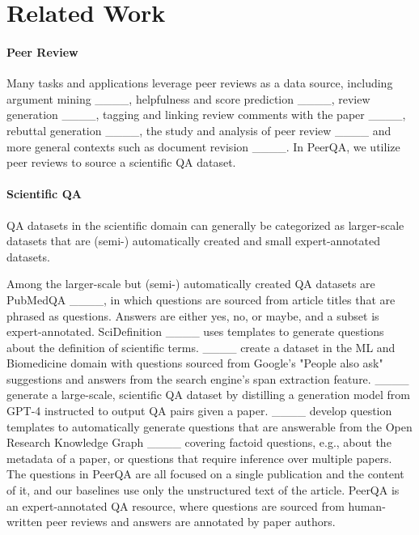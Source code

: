 \section{Related Work}
\paragraph{Peer Review} Many tasks and applications leverage peer reviews as a data source, including argument mining ____, helpfulness and score prediction ____, review generation ____, tagging and linking review comments with the paper ____, rebuttal generation ____, the study and analysis of peer review ____ and more general contexts such as document revision ____. In PeerQA, we utilize peer reviews to source a scientific QA dataset.

\paragraph{Scientific QA} QA datasets in the scientific domain can generally be categorized as larger-scale datasets that are (semi-) automatically created and small expert-annotated datasets. 



Among the larger-scale but (semi-) automatically created QA datasets are PubMedQA ____, in which questions are sourced from article titles that are phrased as questions. Answers are either yes, no, or maybe, and a subset is expert-annotated. SciDefinition ____ uses templates to generate questions about the definition of scientific terms. ____ create a dataset in the ML and Biomedicine domain with questions sourced from Google's "People also ask" suggestions and answers from the search engine's span extraction feature. 
____ generate a large-scale, scientific QA dataset by distilling a generation model from \mbox{GPT-4} instructed to output QA pairs given a paper. 
____ develop question templates to automatically generate questions that are answerable from the Open Research Knowledge Graph ____ covering factoid questions, e.g., about the metadata of a paper, or questions that require inference over multiple papers. The questions in PeerQA are all focused on a single publication and the content of it, and our baselines use only the unstructured text of the article. PeerQA is an expert-annotated QA resource, where questions are sourced from human-written peer reviews and answers are annotated by paper authors.

